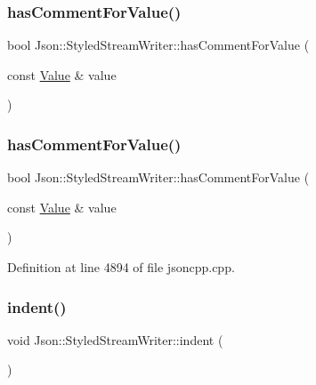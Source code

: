 \subsubsection{\texorpdfstring{has\+Comment\+For\+Value()}{hasCommentForValue()}\hspace{0.1cm}{\footnotesize\ttfamily [1/2]}}
{\footnotesize\ttfamily bool Json\+::\+Styled\+Stream\+Writer\+::has\+Comment\+For\+Value (\begin{DoxyParamCaption}\item[{const \hyperlink{class_json_1_1_value}{Value} \&}]{value }\end{DoxyParamCaption})\hspace{0.3cm}{\ttfamily [private]}}

\hypertarget{class_json_1_1_styled_stream_writer_ad2892f57171919fa4f8a5ae5574755cf}{}\label{class_json_1_1_styled_stream_writer_ad2892f57171919fa4f8a5ae5574755cf} 
\subsubsection{\texorpdfstring{has\+Comment\+For\+Value()}{hasCommentForValue()}\hspace{0.1cm}{\footnotesize\ttfamily [2/2]}}
{\footnotesize\ttfamily bool Json\+::\+Styled\+Stream\+Writer\+::has\+Comment\+For\+Value (\begin{DoxyParamCaption}\item[{const \hyperlink{class_json_1_1_value}{Value} \&}]{value }\end{DoxyParamCaption})\hspace{0.3cm}{\ttfamily [private]}}



Definition at line 4894 of file jsoncpp.\+cpp.

\hypertarget{class_json_1_1_styled_stream_writer_ab49409578422aa73b060e3492dd6c72a}{}\label{class_json_1_1_styled_stream_writer_ab49409578422aa73b060e3492dd6c72a} 
\subsubsection{\texorpdfstring{indent()}{indent()}\hspace{0.1cm}{\footnotesize\ttfamily [1/2]}}
{\footnotesize\ttfamily void Json\+::\+Styled\+Stream\+Writer\+::indent (\begin{DoxyParamCaption}{ }\end{DoxyParamCaption})\hspace{0.3cm}{\ttfamily [private]}}


